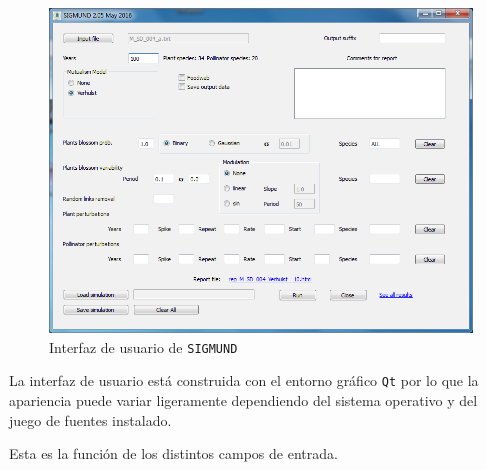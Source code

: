 \begin{figure}[h!]
\centering
\includegraphics[scale=1]{ManFigs/sigmund_ui.png}
\caption{Interfaz de usuario de \texttt{SIGMUND} }
\label{fig:ASIGMUNDMAN_matricessim}
\end{figure}

La interfaz de usuario está construida con el entorno gráfico \texttt{Qt} por lo que la apariencia puede variar ligeramente dependiendo del sistema operativo y del juego de fuentes instalado. 

Esta es la función de los distintos campos de entrada.

